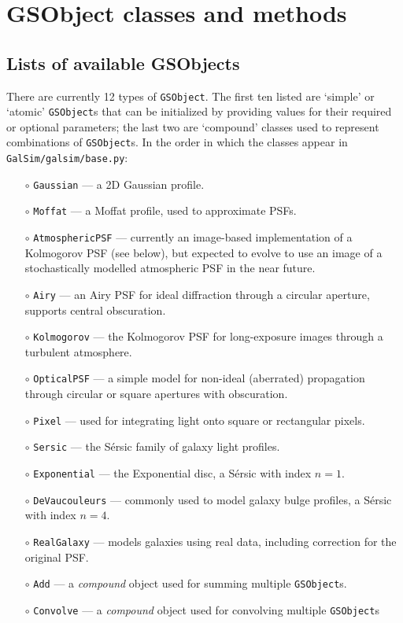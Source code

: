 \documentclass[preprint,10pt]{aastex}
\newcommand{\gsobject}{{\tt GSObject}}
\begin{document}
\newpage 

\section{GSObject classes and methods}\label{sect:gsobjects}
\subsection{Lists of available GSObjects}

There are currently 12 types of \gsobject. The first ten listed are
`simple' or `atomic' \gsobject s that can be initialized by providing
values for their required or optional parameters; the last two are
`compound' classes used to represent combinations of \gsobject s.  
In the order in which the classes appear in {\tt GalSim/galsim/base.py}:
\begin{itemize}
\item[$\circ$] \texttt{Gaussian} --- a 2D Gaussian profile.
\item[$\circ$] \texttt{Moffat} --- a Moffat profile, used to approximate PSFs.
\item[$\circ$] \texttt{AtmosphericPSF} --- currently an image-based
  implementation of a Kolmogorov PSF (see below), but expected to evolve to
  use an image of a stochastically modelled atmospheric PSF in the near future.
\item[$\circ$] \texttt{Airy} --- an Airy PSF for ideal diffraction
  through a circular aperture, supports central obscuration.
\item[$\circ$] \texttt{Kolmogorov} --- the Kolmogorov PSF for long-exposure
  images through a turbulent atmosphere.
\item[$\circ$] \texttt{OpticalPSF} --- a simple model for non-ideal
  (aberrated) propagation through circular or square apertures with obscuration.
\item[$\circ$] \texttt{Pixel} --- used for integrating light onto square or
  rectangular pixels.
\item[$\circ$] \texttt{Sersic} --- the S\'{e}rsic family of galaxy light
  profiles.
\item[$\circ$] \texttt{Exponential} --- the Exponential disc, a S\'{e}rsic
  with index $n=1$.
\item[$\circ$] \texttt{DeVaucouleurs} --- commonly used to model galaxy bulge
  profiles, a S\'{e}rsic with index $n=4$.
\item[$\circ$] \texttt{RealGalaxy} --- models galaxies using real
  data, including correction for the original PSF.
\item[$\circ$] \texttt{Add} --- a \emph{compound} object used for
  summing multiple \gsobject s.
\item[$\circ$] \texttt{Convolve} --- a \emph{compound} object used for
convolving multiple \gsobject s
\end{itemize}
\end{document}
